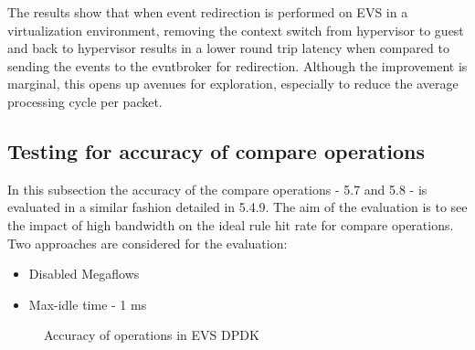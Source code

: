The results show that when event redirection is performed on EVS in a virtualization environment, removing the context switch from hypervisor to guest and back to hypervisor results in a lower round trip latency when compared to sending the events to the evntbroker for redirection. Although the improvement is marginal, this opens up avenues for exploration, especially to reduce the average processing cycle per packet.



\subsection{Testing for accuracy of compare operations}
In this subsection the accuracy of the compare operations - 5.7 and 5.8 - is evaluated in a similar fashion detailed in 5.4.9. The aim of the evaluation is to see the impact of high bandwidth on the ideal rule hit rate for compare operations. Two approaches are considered for the evaluation: 
\begin{itemize}
	\item Disabled Megaflows
	\item Max-idle time - 1 ms
\end{itemize} 




\delaydata



\begin{figure}[H]
	\noindent\hrulefill
	
	\noindent
	\caption{Accuracy of  operations in EVS DPDK}
	\hfil
\end{figure}


